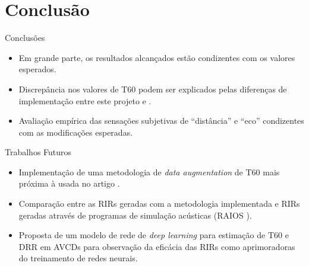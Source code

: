 \section{Conclusão}

\begin{frame} {Conclusões}
    \begin{itemize}
        \justifying
        \item Em grande parte, os resultados alcançados estão condizentes com os valores esperados.
        \item Discrepância nos valores de T60 podem ser explicados pelas diferenças de implementação entre este projeto e \cite{RIR_Data_Aug}.
        \item Avaliação empírica das sensações subjetivas de “distância” e “eco” condizentes com as modificações esperadas.
    \end{itemize}
\end{frame}

\begin{frame} {Trabalhos Futuros}
    \begin{itemize}
        \justifying
        \item Implementação de uma metodologia de \textit{data augmentation} de T60 mais próxima à usada no artigo \cite{RIR_Data_Aug}.
        \item Comparação entre as RIRs geradas com a metodologia implementada e RIRs geradas através de programas de simulação acústicas (RAIOS \cite{RAIOS}).
        \item Proposta de um modelo de rede de \textit{deep learning} para estimação de T60 e DRR em AVCDs para observação da eficácia das RIRs 
        como aprimoradoras do treinamento de redes neurais.
    \end{itemize}
\end{frame}

\begin{frame}
    \centering
    \huge{\textbf{}}
\end{frame}